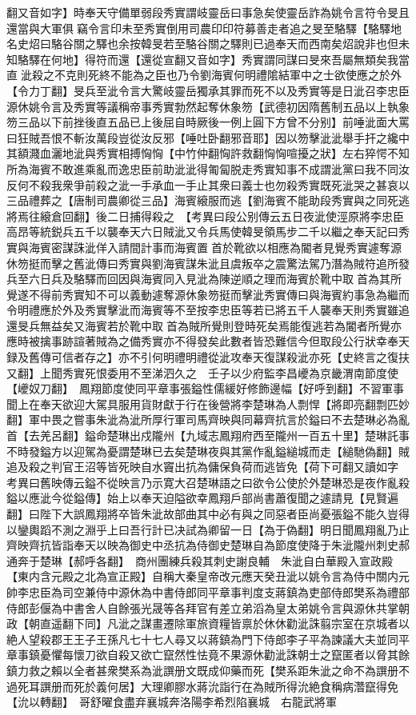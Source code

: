 翻又音如字】時奉天守備單弱段秀實謂岐靈岳曰事急矣使靈岳詐為姚令言符令旻且還當與大軍俱竊令言印未至秀實倒用司農印印符募善走者追之旻至駱驛【駱驛地名史炤曰駱谷關之驛也余按韓旻若至駱谷關之驛則已過奉天而西南矣炤說非也但未知駱驛在何地】得符而還【還從宣翻又音如字】秀實謂同謀曰旻來吾屬無類矣我當直泚殺之不克則死終不能為之臣也乃令劉海賓何明禮隂結軍中之士欲使應之於外【令力丁翻】旻兵至泚令言大驚岐靈岳獨承其罪而死不以及秀實等是日泚召李忠臣源休姚令言及秀實等議稱帝事秀實勃然起奪休象笏【武德初因隋舊制五品以上執象笏三品以下前挫後直五品已上後屈自時厥後一例上圓下方曾不分别】前唾泚面大罵曰狂賊吾恨不斬汝萬段豈從汝反邪【唾吐卧翻邪音耶】因以笏擊泚泚舉手扞之纔中其額濺血灑地泚與秀實相搏恟恟【中竹仲翻恟許救翻恟恟喧擾之狀】左右猝愕不知所為海賓不敢進乘亂而逸忠臣前助泚泚得匍匐脱走秀實知事不成謂泚黨曰我不同汝反何不殺我衆爭前殺之泚一手承血一手止其衆曰義士也勿殺秀實既死泚哭之甚哀以三品禮葬之【唐制司農卿從三品】海賓縗服而逃【劉海賓不能助段秀實與之同死逃將焉往縗倉回翻】後二日捕得殺之　【考異曰段公别傳云五日夜泚使涇原將李忠臣高昂等統鋭兵五千以襲奉天六日賊泚又令兵馬使韓旻領馬步二千以繼之奉天記曰秀實與海賓密謀誅泚佯入請間計事而海賓置首於靴欲以相應為閽者見覺秀實遽奪源休笏挺而擊之舊泚傳曰秀實與劉海賓謀朱泚且虞叛卒之震驚法駕乃潛為賊符追所發兵至六日兵及駱驛而回因與海賓同入見泚為陳逆順之理而海賓於靴中取首為其所覺遂不得前秀實知不可以義動遽奪源休象笏挺而擊泚秀實傳曰與海賓約事急為繼而令明禮應於外及秀實擊泚而海賓等不至按李忠臣等若已將五千人襲奉天則秀實雖追還旻兵無益矣又海賓若於靴中取首為賊所覺則登時死矣焉能復逃若為閽者所覺亦應時被擒事跡諠著賊為之備秀實亦不得發矣此數者皆恐難信今但取段公行狀幸奉天録及舊傳可信者存之】亦不引何明禮明禮從泚攻奉天復謀殺泚亦死【史終言之復扶又翻】上聞秀實死恨委用不至涕泗久之　壬子以少府監李昌巙為京畿渭南節度使【巙奴刀翻】　鳳翔節度使同平章事張鎰性儒緩好修飾邊幅【好呼到翻】不習軍事聞上在奉天欲迎大駕具服用貨財獻于行在後營將李楚琳為人剽悍【將即亮翻剽匹妙翻】軍中畏之嘗事朱泚為泚所厚行軍司馬齊映與同幕齊抗言於鎰曰不去楚琳必為亂首【去羌呂翻】鎰命楚琳出戍隴州【九域志鳳翔府西至隴州一百五十里】楚琳託事不時發鎰方以迎駕為憂謂楚琳已去矣楚琳夜與其黨作亂鎰縋城而走【縋馳偽翻】賊追及殺之判官王沼等皆死映自水竇出抗為傭保負荷而逃皆免【荷下可翻又讀如字　考異曰舊映傳云鎰不從映言乃示寛大召楚琳語之曰欲令公使於外楚琳恐是夜作亂殺鎰以應泚今從鎰傳】始上以奉天迫隘欲幸鳳翔戶部尚書蕭復聞之遽請見【見賢遍翻】曰陛下大誤鳳翔將卒皆朱泚故部曲其中必有與之同惡者臣尚憂張鎰不能久豈得以鑾輿蹈不測之淵乎上曰吾行計已决試為卿留一日【為于偽翻】明日聞鳳翔亂乃止齊映齊抗皆詣奉天以映為御史中丞抗為侍御史楚琳自為節度使降于朱泚隴州刺史郝通奔于楚琳【郝呼各翻】　商州團練兵殺其刺史謝良輔　朱泚自白華殿入宣政殿【東内含元殿之北為宣正殿】自稱大秦皇帝改元應天癸丑泚以姚令言為侍中關内元帥李忠臣為司空兼侍中源休為中書侍郎同平章事判度支蔣鎮為吏部侍郎樊系為禮部侍郎彭偃為中書舍人自餘張光晟等各拜官有差立弟滔為皇太弟姚令言與源休共掌朝政【朝直遥翻下同】凡泚之謀畫遷除軍旅資糧皆禀於休休勸泚誅翦宗室在京城者以絶人望殺郡王王子王孫凡七十七人尋又以蔣鎮為門下侍郎李子平為諫議大夫並同平章事鎮憂懼每懷刀欲自殺又欲亡竄然性怯竟不果源休勸泚誅朝士之竄匿者以脅其餘鎮力救之賴以全者甚衆樊系為泚譔册文既成仰藥而死【樊系距朱泚之命不為譔册不過死耳譔册而死於義何居】大理卿膠水蔣沇詣行在為賊所得沇絶食稱病濳竄得免【沇以轉翻】　哥舒曜食盡弃襄城奔洛陽李希烈陷襄城　右龍武將軍